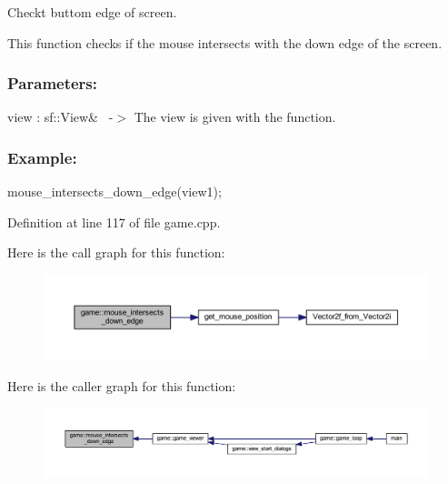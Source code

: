 Checkt buttom edge of screen. 

This function checks if the mouse intersects with the down edge of the screen.~\newline
 \subsubsection*{Parameters\+: }

view \+: sf\+::\+View\&~\newline
-\/$>$ The view is given with the function.

\subsubsection*{Example\+: }

mouse\+\_\+intersects\+\_\+down\+\_\+edge(view1); 

Definition at line 117 of file game.\+cpp.

Here is the call graph for this function\+:
\nopagebreak
\begin{figure}[H]
\begin{center}
\leavevmode
\includegraphics[width=350pt]{classgame_a34a5241e205d0985a9e477a3dd77ba08_cgraph}
\end{center}
\end{figure}
Here is the caller graph for this function\+:
\nopagebreak
\begin{figure}[H]
\begin{center}
\leavevmode
\includegraphics[width=350pt]{classgame_a34a5241e205d0985a9e477a3dd77ba08_icgraph}
\end{center}
\end{figure}
\mbox{\label{classgame_ae263cdc30dcc916b98b0ddbbf0a6fccc}} 
